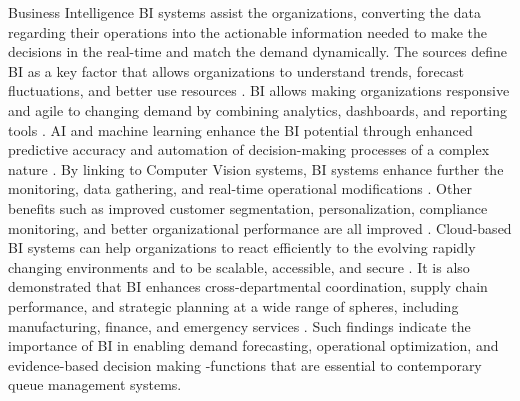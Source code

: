 \documentclass{research}
\begin{document}
Business Intelligence BI systems assist the organizations, converting the data regarding their operations into the actionable information needed to make the decisions in the real-time and match the demand dynamically. The sources define BI as a key factor that allows organizations to understand trends, forecast fluctuations, and better use resources \cite{ref42} \cite{ref43} \cite{ref44} \cite{ref45}. BI allows making organizations responsive and agile to changing demand by combining analytics, dashboards, and reporting tools \cite{ref46} \cite{ref48} \cite{ref49} \cite{ref50}. AI and machine learning enhance the BI potential through enhanced predictive accuracy and automation of decision-making processes of a complex nature \cite{ref57} \cite{ref68} \cite{ref56}. By linking to Computer Vision systems, BI systems enhance further the monitoring, data gathering, and real-time operational modifications \cite{ref41} \cite{ref69}. Other benefits such as improved customer segmentation, personalization, compliance monitoring, and better organizational performance are all improved \cite{ref62} \cite{ref59}. Cloud-based BI systems can help organizations to react efficiently to the evolving rapidly changing environments and to be scalable, accessible, and secure \cite{ref60} \cite{ref67}. It is also demonstrated that BI enhances cross-departmental coordination, supply chain performance, and strategic planning at a wide range of spheres, including manufacturing, finance, and emergency services \cite{ref63} \cite{ref66} \cite{ref58}. Such findings indicate the importance of BI in enabling demand forecasting, operational optimization, and evidence-based decision making -functions that are essential to contemporary queue management systems.
\end{document}
